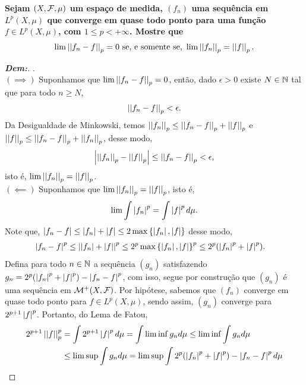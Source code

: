 \textbf{Sejam $(X, \mcal F, \mu)$ um espaço de medida, 
$(f_n)$ uma sequência em $L^p(X, \mu)$ que converge em quase todo ponto 
para uma função $f \in L^p(X, \mu)$, com $1\le p < +\infty$. Mostre que 
\begin{align*}
  \lim \pnorm p {f_n - f} = 0 \text{ se, e somente se, } \lim \pnorm p {f_n} = \pnorm p f.
\end{align*}}
\begin{proof}[\textbf{Dem:}].\\
  $(\implies)$ Suponhamos que $\lim \pnorm p {f_n - f} = 0$, então, 
  dado $\epsilon > 0$ existe $N \in \bN$ tal que para todo $n \ge N$, 
  \begin{align*}
    \pnorm p {f_n - f} < \epsilon.
  \end{align*}
  Da Desigualdade de Minkowski, temos $\pnorm p {f_n} \le \pnorm p {f_n - f} + \pnorm p f$
  e $\pnorm p f \le \pnorm p {f_n - f} + \pnorm p {f_n}$, desse modo, 
  \begin{align*}
    \mparth{\pnorm p {f_n} - \pnorm p f}\le \pnorm p {f_n - f} < \epsilon,
  \end{align*}
  isto é, $\lim \pnorm p {f_n} = \pnorm p f$.\\
  $(\impliedby)$ Suponhamos que $\lim \pnorm p {f_n} = \pnorm p f$, isto é,
  \begin{align*}
    \lim \int \mparth{f_n}^p = \int \mparth{f}^p d\mu.
  \end{align*}  
  Note que, $\mparth{f_n - f} \le \mparth{f_n} + \mparth{f} \le 2\max\set{\mparth{f_n}, \mparth{f}}$
  desse modo, 
  \begin{align*}
    \mparth{f_n - f}^p &\le \mparth{|f_n| + |f|}^p  
    \le 2^p \max\set{\mparth{f_n}, \mparth{f}}^p 
    \le 2^p (\mparth{f_n}^p + \mparth{f}^p).
  \end{align*}
  Defina para todo $n \in \bN$ a sequência $(g_n)$ satisfazendo 
  $g_n = 2^p(\mparth{f_n}^p + \mparth{f}^p) - \mparth{f_n - f}^p$, com isso, segue 
  por construção que $(g_n)$ é uma sequência em $\mcal M^+(X, \mcal F)$. Por hipótese, 
  sabemos que $(f_n)$ converge em quase todo ponto para $f \in L^p(X, \mu)$, sendo assim,
  $(g_n)$ converge para $2^{p+1}\mparth{f}^p$. Portanto, do Lema de Fatou, 
  \begin{align*}
    2^{p+1} \pnorm p f^p&= \int 2^{p+1}\mparth{f}^p d\mu =\int \lim \inf g_n d\mu \le
    \lim \inf \int g_n d\mu \\ 
    &\le \lim \sup \int g_n d\mu 
    = \lim \sup \int 2^p(\mparth{f_n}^p + \mparth{f}^p) - \mparth{f_n - f}^p d\mu\\

\end{align*}
\end{proof}
